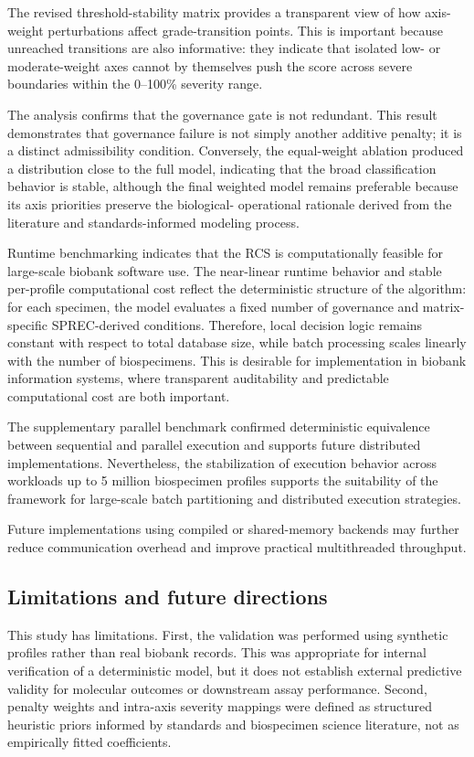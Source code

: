 \documentclass[preprint,12pt]{elsarticle}
\begin{document}
The revised threshold-stability matrix provides a transparent view of how axis-weight perturbations affect grade-transition points. This is 
important because unreached transitions are also informative: they indicate that isolated low- or moderate-weight axes cannot by themselves 
push the 
score across severe boundaries within the 0--100\% severity range.

The analysis confirms that the governance gate is not redundant. This result demonstrates that governance failure is not simply another 
additive penalty; it is a distinct admissibility 
condition. Conversely, the equal-weight ablation produced a distribution close to the full model, indicating that the broad classification 
behavior is stable, although the final weighted 
model remains preferable because its axis priorities preserve the biological-
operational rationale derived from the literature and standards-informed modeling process.

Runtime benchmarking indicates that the RCS is computationally feasible for large-scale biobank software use. The near-linear runtime behavior 
and stable per-profile computational cost reflect the deterministic structure of the algorithm: for each specimen, the model evaluates a fixed 
number of governance and matrix-specific SPREC-derived conditions. Therefore, local decision logic remains constant with respect to total 
database size, while batch processing scales linearly with the number of biospecimens. This is desirable for implementation in biobank 
information systems, where transparent auditability and predictable computational 
cost are both important. 

The supplementary parallel benchmark confirmed deterministic equivalence between sequential and parallel execution and supports future 
distributed implementations. Nevertheless, the stabilization of execution behavior across workloads up to 5 million biospecimen profiles 
supports the suitability of the framework for large-scale batch partitioning and distributed execution strategies. 

Future implementations using compiled or shared-memory backends may further reduce communication overhead and improve practical multithreaded 
throughput.

\subsection*{Limitations and future directions}

This study has limitations. First, the validation was performed using synthetic profiles rather than real biobank records. This was appropriate for internal verification of a deterministic 
model, but it does not establish external predictive validity for molecular outcomes or downstream assay performance. Second, penalty weights and intra-axis severity mappings were defined 
as structured heuristic priors informed by standards and biospecimen science literature, not as empirically fitted coefficients.
\end{document}
